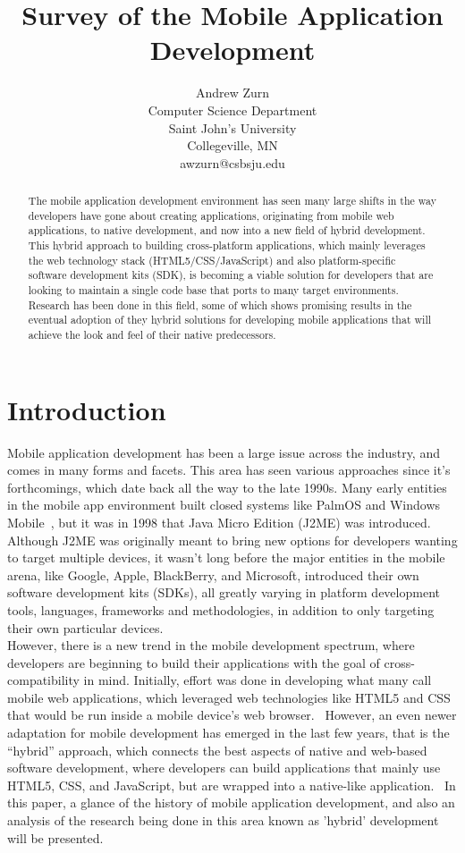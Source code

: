 \documentclass[11pt]{article}
\title{Survey of the Mobile Application Development}
\author[1]{Andrew Zurn\\Computer Science Department\\Saint John's University\\Collegeville, MN\\awzurn@csbsju.edu}
\begin{document}
\maketitle
\begin{abstract}
\noindent The mobile application development environment has seen many large shifts in the way developers have gone about creating applications, originating from mobile web applications, to native development, and now into a new field of hybrid development.  This hybrid approach to building cross-platform applications, which mainly leverages the web technology stack (HTML5/CSS/JavaScript) and also platform-specific software development kits (SDK), is becoming a viable solution for developers that are looking to maintain a single code base that ports to many target environments.  Research has been done in this field, some of which shows promising results in the eventual adoption of they hybrid solutions for developing mobile applications that will achieve the look and feel of their native predecessors.
\end{abstract}

\section{Introduction}
\setlength{\parindent}{.75cm}
Mobile application development has been a large issue across the industry, and comes in many forms and facets.  This area has seen various approaches since it's forthcomings, which date back all the way to the late 1990s.  Many early entities in the mobile app environment built closed systems like PalmOS and Windows Mobile~\cite{Dediu2011}, but it was in 1998 that Java Micro Edition (J2ME) was introduced.  Although J2ME was originally meant to bring new options for developers wanting to target multiple devices, it wasn't long before the major entities in the mobile arena, like Google, Apple, BlackBerry, and Microsoft, introduced their own software development kits (SDKs), all greatly varying in platform development tools, languages, frameworks and methodologies, in addition to only targeting their own particular devices.~\cite{Corral2011}\\

\indent However, there is a new trend in the mobile development spectrum, where developers are beginning to build their applications with the goal of cross-compatibility in mind.  Initially, effort was done in developing what many call mobile web applications, which leveraged web technologies like HTML5 and CSS that would be run inside a mobile device’s web browser.~\cite{Leroux2011}  However, an even newer adaptation for mobile development has emerged in the last few years, that is the “hybrid” approach, which connects the best aspects of native and web-based software development, where developers can build applications that mainly use HTML5, CSS, and JavaScript, but are wrapped into a native-like application.~\cite{Xanthopoulos2013}  In this paper, a glance of the history of mobile application development, and also an analysis of the research being done in this area known as 'hybrid' development will be presented.\\
\end{document}
